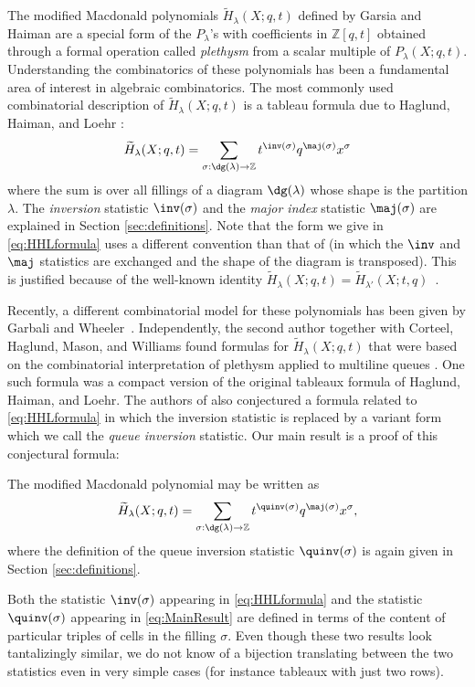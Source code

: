 The modified Macdonald polynomials $\widetilde{H}_{\lambda}(X;q,t)$ defined by Garsia and Haiman \cite{garsia-haiman-1993} are a special form of the $P_{\lambda}$'s with coefficients in $\mathbb{Z}[q,t]$ obtained through a formal operation called \emph{plethysm} from a scalar multiple of $P_{\lambda}(X;q,t)$. Understanding the combinatorics of these polynomials has been a fundamental area of interest in algebraic combinatorics. The most commonly used combinatorial description of $\widetilde{H}_{\lambda}(X;q,t)$ is a tableau formula due to Haglund, Haiman, and Loehr \cite{HHL05}:
\begin{equation}
\label{eq:HHLformula}
\widetilde{H}_{\lambda}(X;q,t) = \sum_{\sigma:\dg(\lambda) \rightarrow \mathbb{Z}} t^{\inv(\sigma)}q^{\maj(\sigma)}x^{\sigma}
\end{equation}
where the sum is over all fillings of a diagram $\dg(\lambda)$ whose shape is the partition $\lambda$. The \emph{inversion} statistic $\inv(\sigma)$ and the \emph{major index} statistic $\maj(\sigma)$ are explained in Section \ref{sec:definitions}. Note that the form we give in \eqref{eq:HHLformula} uses a different convention than that of \cite{HHL05} (in which the $\inv$ and $\maj$ statistics are exchanged and the shape of the diagram is transposed). This is justified because of the well-known identity $\widetilde{H}_{\lambda}(X;q,t) = \widetilde{H}_{\lambda'}(X;t,q)$~\cite[Prop. 2.6]{Hai99}. 



Recently, a different combinatorial model for these polynomials has been given by Garbali and Wheeler~\cite{garbali-wheeler-2020}. Independently, the second author together with Corteel, Haglund, Mason, and Williams found formulas for $\widetilde{H}_{\lambda}(X;q,t)$ that were based on the combinatorial interpretation of plethysm applied to multiline queues \cite{compactformula}. One such formula was a compact version of the original tableaux formula of Haglund, Haiman, and Loehr. The authors of \cite{compactformula} also conjectured a formula related
to \eqref{eq:HHLformula} in which the inversion statistic is replaced by a variant
form which we call the \emph{queue inversion} statistic.
Our main result  is a proof of this conjectural formula:
\begin{thm*}
The modified Macdonald polynomial may be written as
\begin{equation}\label{eq:MainResult}
\widetilde{H}_{\lambda}(X;q,t) = \sum_{\sigma:\dg(\lambda) \rightarrow \mathbb{Z}} t^{\quinv(\sigma)}q^{\maj(\sigma)}x^{\sigma},
\end{equation}
where the definition of the queue inversion statistic $\quinv(\sigma)$ is 
again given in Section \ref{sec:definitions}.
\end{thm*}
Both the statistic $\inv(\sigma)$ appearing in \eqref{eq:HHLformula}
and the statistic $\quinv(\sigma)$ appearing in \eqref{eq:MainResult}
are defined in terms of the content of particular triples of cells in the filling $\sigma$. 
Even though these two results look tantalizingly similar, we do 
not know of a bijection translating between the two statistics even in very simple 
cases (for instance tableaux with just two rows). 

